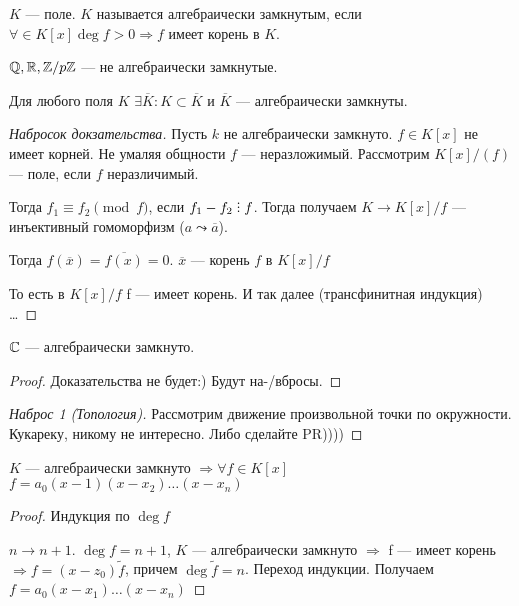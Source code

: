 \begin{definition}
    $K$ --- поле.  $K$ называется алгебраически замкнутым, если  $\forall \in K[x] \deg f > 0 \Rightarrow f$ имеет корень в  $K$.    
\end{definition}
\begin{exerc}
    $\mathbb{Q}, \mathbb{R}, \mathbb{Z} / p \mathbb{Z}$ --- не алгебраически замкнутые.
\end{exerc}
\begin{theorem}
    Для любого поля $K$  $\exists \overline{K}: K \subset \overline{K}$ и $\overline{K}$ --- алгебраически замкнуты.
\end{theorem}
\begin{proof}[Набросок докзательства]
    Пусть $k$ не алгебраически замкнуто.  $f \in K[x]$ не имеет корней. Не умаляя общности  $f$ --- неразложимый. Рассмотрим  $K[x] / (f)$ --- поле, если  $f$ неразличимый.

    Тогда  $f_1 \equiv f_2 \pmod f$, если $f_1 - f_2 \divby f$. Тогда получаем $K \to K[x] / f$ --- инъективный гомоморфизм ($a \leadsto \overline{a}$). 

    Тогда $f(\overline{x}) = \overline{f(x)} = 0$.  $\overline{x}$ --- корень  $f$ в  $K[x] / f$

    То есть в  $K[x] / f$ f --- имеет корень. И так далее (трансфинитная индукция) \dots
\end{proof}
\begin{theorem}
    $\mathbb{C}$ --- алгебраически замкнуто.
\end{theorem}
\begin{proof}
    Доказательства не будет:) Будут на-/вбросы.
\end{proof}
\begin{proof}[Наброс 1 (Топология)]
    Рассмотрим движение произвольной точки по окружности. Кукареку, никому не интересно. Либо сделайте PR))))
\end{proof}
\begin{consequence}
    $K$ --- алгебраически замкнуто  $\Rightarrow \forall f \in K[x]$  $f = a_0(x-1)(x-x_2)\ldots(x-x_n)$
\end{consequence}
\begin{proof}
    Индукция по $\deg f$
     
    $n \to n+1$.  $\deg f = n+1$,  $K$ --- алгебраически замкнуто  $\Rightarrow$ f --- имеет корень  $\Rightarrow f = (x-z_0)\widetilde{f}$, причем $\deg \widetilde{f} = n$. Переход индукции. Получаем $f = a_0(x-x_1)\ldots(x-x_n)$
\end{proof}
